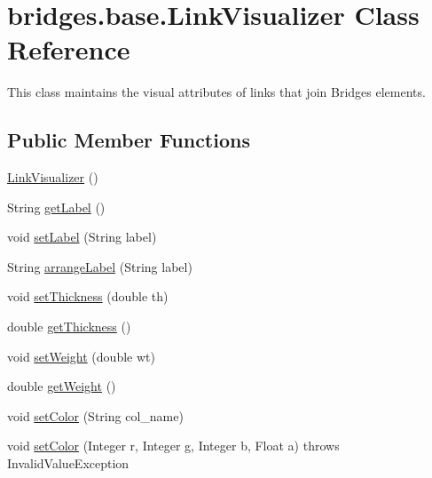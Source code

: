 \hypertarget{classbridges_1_1base_1_1_link_visualizer}{}\section{bridges.\+base.\+Link\+Visualizer Class Reference}
\label{classbridges_1_1base_1_1_link_visualizer}


This class maintains the visual attributes of links that join Bridges elements.  


\subsection*{Public Member Functions}
\begin{DoxyCompactItemize}
\item 
\mbox{\hyperlink{classbridges_1_1base_1_1_link_visualizer_a0b69f099fa264ae9097b0efe278c6a1b}{Link\+Visualizer}} ()
\item 
String \mbox{\hyperlink{classbridges_1_1base_1_1_link_visualizer_a9ed60a0f8a337cd2c98b2d6ab07b8601}{get\+Label}} ()
\item 
void \mbox{\hyperlink{classbridges_1_1base_1_1_link_visualizer_a073d84e04dd95c3848c9f4e0ad74eb77}{set\+Label}} (String label)
\item 
String \mbox{\hyperlink{classbridges_1_1base_1_1_link_visualizer_a9f5ca95a4ab07165bbe0de271534cc41}{arrange\+Label}} (String label)
\item 
void \mbox{\hyperlink{classbridges_1_1base_1_1_link_visualizer_a702e9ca345d1a4a035baf2041f275849}{set\+Thickness}} (double th)
\item 
double \mbox{\hyperlink{classbridges_1_1base_1_1_link_visualizer_af1592d2a8664b00c1a51fdc0f8d1860a}{get\+Thickness}} ()
\item 
void \mbox{\hyperlink{classbridges_1_1base_1_1_link_visualizer_a21d5884d243cf5a08f9d544f5083a44c}{set\+Weight}} (double wt)
\item 
double \mbox{\hyperlink{classbridges_1_1base_1_1_link_visualizer_ac96d7fb118ae6c7e1bdd57c5e2c8639a}{get\+Weight}} ()
\item 
void \mbox{\hyperlink{classbridges_1_1base_1_1_link_visualizer_a92f306dbd73b961befa8ab4c0620a89e}{set\+Color}} (String col\+\_\+name)
\item 
void \mbox{\hyperlink{classbridges_1_1base_1_1_link_visualizer_a003905cfe33e1704555b2b3a1cf99bad}{set\+Color}} (Integer r, Integer g, Integer b, Float a)  throws Invalid\+Value\+Exception 

\end{DoxyCompactItemize}
